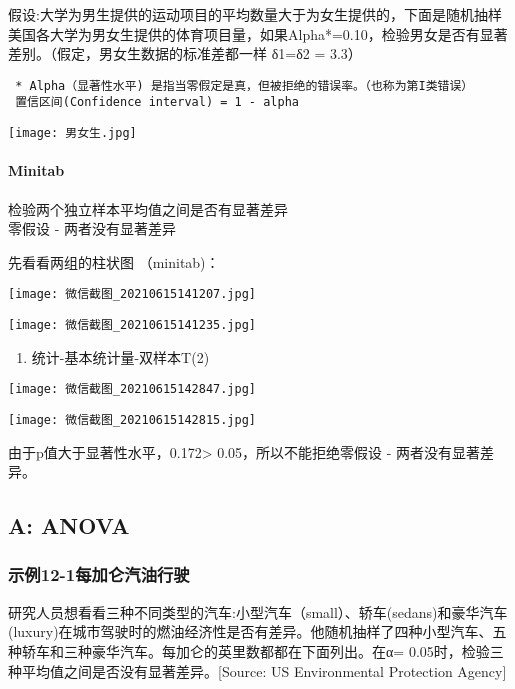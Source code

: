 假设:大学为男生提供的运动项目的平均数量大于为女生提供的，下面是随机抽样美国各大学为男女生提供的体育项目量，如果Alpha*=0.10，检验男女是否有显著差别。（假定，男女生数据的标准差都一样
δ1=δ2 = 3.3）

\texttt{~*~Alpha（显著性水平)~是指当零假定是真，但被拒绝的错误率。（也称为第I类错误）~}\\
\texttt{~置信区间(Confidence~interval)~=~1~-~alpha}


\texttt{[image: 男女生.jpg]}

\hypertarget{minitab}{%
\paragraph{Minitab}\label{minitab}}

检验两个独立样本平均值之间是否有显著差异\\
零假设 - 两者没有显著差异

先看看两组的柱状图 （minitab)：


\texttt{[image: 微信截图\_20210615141207.jpg]}


\texttt{[image: 微信截图\_20210615141235.jpg]}

\begin{enumerate}
\tightlist
\item
  统计-基本统计量-双样本T(2)
\end{enumerate}

\texttt{[image: 微信截图\_20210615142847.jpg]}


\texttt{[image: 微信截图\_20210615142815.jpg]}

由于p值大于显著性水平，0.172\textgreater{} 0.05，所以不能拒绝零假设 -
两者没有显著差异。

\hypertarget{a-anova}{%
\subsection{A: ANOVA}\label{a-anova}}

\hypertarget{ux793aux4f8b12-1ux6bcfux52a0ux4ed1ux6c7dux6cb9ux884cux9a76}{%
\subsubsection{示例12-1每加仑汽油行驶}\label{ux793aux4f8b12-1ux6bcfux52a0ux4ed1ux6c7dux6cb9ux884cux9a76}}

研究人员想看看三种不同类型的汽车:小型汽车（small）、轿车(sedans)和豪华汽车(luxury)在城市驾驶时的燃油经济性是否有差异。他随机抽样了四种小型汽车、五种轿车和三种豪华汽车。每加仑的英里数都都在下面列出。在α=
0.05时，检验三种平均值之间是否没有显著差异。{[}Source: US Environmental
Protection Agency{]}

